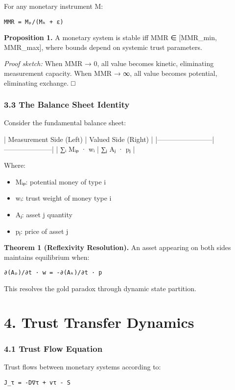 \documentclass[11pt,oneside]{book}
\begin{document}
{{{{{{For any monetary instrument M:

\begin{verbatim}
MMR = Mₚ/(Mₖ + ε)
\end{verbatim}

\textbf{Proposition 1.} A monetary system is stable iff MMR ∈ [MMR_min, MMR_max], where bounds depend on systemic trust parameters.

\textit{Proof sketch:} When MMR → 0, all value becomes kinetic, eliminating measurement capacity. When MMR → ∞, all value becomes potential, eliminating exchange. □

\subsubsection{3.3 The Balance Sheet Identity}

Consider the fundamental balance sheet:

| Measurement Side (Left) | Valued Side (Right) |
|------------------------|---------------------|
| ∑ᵢ Mᵢₚ · wᵢ | ∑ⱼ Aⱼ · pⱼ |

Where:
\begin{itemize}
\item Mᵢₚ: potential money of type i
\item wᵢ: trust weight of money type i
\item Aⱼ: asset j quantity
\item pⱼ: price of asset j
\end{itemize}

\textbf{Theorem 1 (Reflexivity Resolution).} An asset appearing on both sides maintains equilibrium when:

\begin{verbatim}
∂(Aₚ)/∂t · w = -∂(Aₖ)/∂t · p
\end{verbatim}

This resolves the gold paradox through dynamic state partition.

\section{4. Trust Transfer Dynamics}

\subsubsection{4.1 Trust Flow Equation}

Trust flows between monetary systems according to:

\begin{verbatim}
J_τ = -D∇τ + vτ - S
\end{verbatim}

}}}}}}
\end{document}
